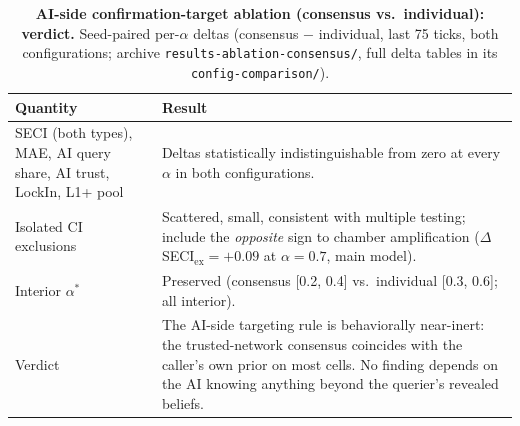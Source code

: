 \documentclass[11pt]{article}
\begin{document}
\begin{table}[h!]
\centering
\caption{\textbf{AI-side confirmation-target ablation (consensus vs.\
individual): verdict.} Seed-paired per-$\alpha$ deltas (consensus $-$
individual, last 75 ticks, both configurations; archive
\texttt{results-ablation-consensus/}, full delta tables in its
\texttt{config-comparison/}).}\label{tab:s4-consensus}
\small
\begin{tabular}{@{}p{4.2cm}p{9.6cm}@{}}
\toprule
Quantity & Result \\
\midrule
SECI (both types), MAE, AI query share, AI trust, LockIn, L1+ pool &
Deltas statistically indistinguishable from zero at every $\alpha$ in
both configurations. \\
Isolated CI exclusions & Scattered, small, consistent with multiple
testing; include the \emph{opposite} sign to chamber amplification
($\Delta$SECI$_{\mathrm{ex}} = +0.09$ at $\alpha = 0.7$, main model). \\
Interior $\alpha^{*}$ & Preserved (consensus [0.2, 0.4] vs.\ individual
[0.3, 0.6]; all interior). \\
\midrule
Verdict & The AI-side targeting rule is behaviorally near-inert: the
trusted-network consensus coincides with the caller's own prior on most
cells. No finding depends on the AI knowing anything beyond the
querier's revealed beliefs. \\
\bottomrule
\end{tabular}
\end{table}
\end{document}
